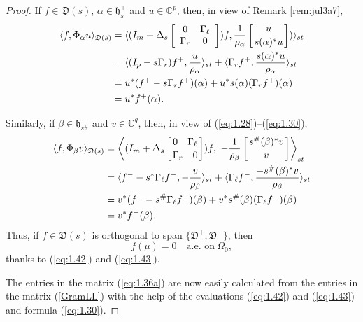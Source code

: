 \documentclass[12pt,twoside,a4paper]{amsart}
\theoremstyle{definition}
\numberwithin{equation}{section}
\begin{document}
\begin{proof}
If $f\in {{\mathfrak D}}(s)$, $\alpha\in {{\mathfrak h}}^+_s$ and $u\in{\mathbb{C}}^p$, then, in view of
Remark \ref{rem:jul3a7},
\begin{equation}\label{eq:1.42}
\begin{split}
\langle f,\Phi_\alpha u\rangle_{{{\mathfrak D}}(s)}&=\langle (I_m+\Delta_s\left[
    \begin{array}{cc}
    0&\Gamma_\ell\\
    \Gamma_r & 0
    \end{array}
    \right])
    f,\frac{1}{\rho_\alpha}\left[{{u}\atop{s(\alpha)^* u}}\right])
\rangle_{st}\\
&=\langle(I_p-s\Gamma_r)f^+,\frac{u}{\rho_\alpha}\rangle_{st}+\langle
  \Gamma_rf^+,\frac{s(\alpha)^*u}{\rho_\alpha}\rangle_{st}\\
  &=u^*(f^+-s\Gamma_r f^+)(\alpha)+u^*s(\alpha)(\Gamma_r
  f^+)(\alpha)\\
  &=u^* f^+(\alpha).
    \end{split}
\end{equation}

Similarly, if $\beta\in {{\mathfrak h}}^-_{s^\#}$ and $v\in {\mathbb{C}}^q$, then, in view of
(\ref{eq:1.28})--(\ref{eq:1.30}),
\begin{equation}\label{eq:1.43}
\begin{split}
  \langle f,\Phi_\beta v
  \rangle_{{{\mathfrak D}}(s)}&=\left\langle(I_m+\Delta_s\left[{{0\quad
  \Gamma_\ell}\atop{\Gamma_r\quad 0}}\right])f,\
  -\frac{1}{\rho_\beta}\left[{{s^\#(\beta)^*v}\atop{v}}\right]
\right\rangle_{st}\\
  &=\langle f^--s^*\Gamma_\ell
  f^-,-\frac{v}{\rho_\beta}\rangle_{st}+\langle\Gamma_\ell
  f^-,\frac{-s^\#(\beta)^*v}{\rho_\beta}\rangle_{st}\\
  &=v^*(f^--s^\#\Gamma_\ell f^-)(\beta)+v^*s^\#(\beta)(\Gamma_\ell f^-)(\beta)\\
  &=v^* f^-(\beta).
    \end{split}
\end{equation}
Thus, if  $f\in{{\mathfrak D}}(s)$ is orthogonal to span $\{{{\mathfrak D}}^+,{{\mathfrak D}}^-\}$, then
$$
f(\mu)=0 \quad \text{a.e. on} \ \Omega_0,
$$
thanks to (\ref{eq:1.42}) and (\ref{eq:1.43}).

The entries in the matrix (\ref{eq:1.36a}) are now easily calculated
from the entries in the matrix (\ref{GramLL}) with the help of the
evaluations (\ref{eq:1.42}) and  (\ref{eq:1.43}) and formula
(\ref{eq:1.30}).


\end{proof}
\end{document}
